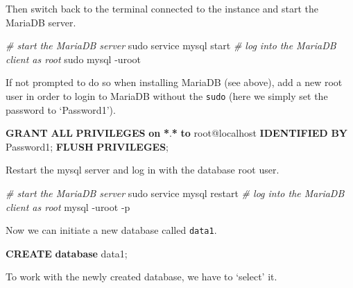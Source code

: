 \documentclass[
  12pt,
]{style/krantz}
\newenvironment{Shaded}{\begin{snugshade}}{\end{snugshade}}
\newcommand{\AttributeTok}[1]{\textcolor[rgb]{0.77,0.63,0.00}{#1}}
\newcommand{\CommentTok}[1]{\textcolor[rgb]{0.56,0.35,0.01}{\textit{#1}}}
\newcommand{\ExtensionTok}[1]{#1}
\newcommand{\FunctionTok}[1]{\textcolor[rgb]{0.00,0.00,0.00}{#1}}
\newcommand{\KeywordTok}[1]{\textcolor[rgb]{0.13,0.29,0.53}{\textbf{#1}}}
\newcommand{\NormalTok}[1]{#1}
\newcommand{\OperatorTok}[1]{\textcolor[rgb]{0.81,0.36,0.00}{\textbf{#1}}}
\newcommand{\StringTok}[1]{\textcolor[rgb]{0.31,0.60,0.02}{#1}}
\begin{document}
Then switch back to the terminal connected to the instance and start the MariaDB server.

\begin{Shaded}
\begin{Highlighting}[]
\CommentTok{\# start the MariaDB server}
\FunctionTok{sudo}\NormalTok{ service mysql start}
\CommentTok{\# log into the MariaDB client as root }
\FunctionTok{sudo}\NormalTok{ mysql }\AttributeTok{{-}uroot} 
\end{Highlighting}
\end{Shaded}

If not prompted to do so when installing MariaDB (see above), add a new root user in order to login to MariaDB without the \texttt{sudo} (here we simply set the password to `Password1').

\begin{Shaded}
\begin{Highlighting}[]
\KeywordTok{GRANT} \KeywordTok{ALL} \KeywordTok{PRIVILEGES} \KeywordTok{on} \OperatorTok{*}\NormalTok{.}\OperatorTok{*} \KeywordTok{to} \StringTok{\textquotesingle{}root\textquotesingle{}}\NormalTok{@}\StringTok{\textquotesingle{}localhost\textquotesingle{}} \KeywordTok{IDENTIFIED} \KeywordTok{BY} \StringTok{\textquotesingle{}Password1\textquotesingle{}}\NormalTok{;}
\KeywordTok{FLUSH} \KeywordTok{PRIVILEGES}\NormalTok{;}
\end{Highlighting}
\end{Shaded}

Restart the mysql server and log in with the database root user.

\begin{Shaded}
\begin{Highlighting}[]
\CommentTok{\# start the MariaDB server}
\FunctionTok{sudo}\NormalTok{ service mysql restart}
\CommentTok{\# log into the MariaDB client as root }
\ExtensionTok{mysql} \AttributeTok{{-}uroot} \AttributeTok{{-}p}
\end{Highlighting}
\end{Shaded}

Now we can initiate a new database called \texttt{data1}.

\begin{Shaded}
\begin{Highlighting}[]
\KeywordTok{CREATE} \KeywordTok{database}\NormalTok{ data1;}
\end{Highlighting}
\end{Shaded}

To work with the newly created database, we have to `select' it.
\end{document}
